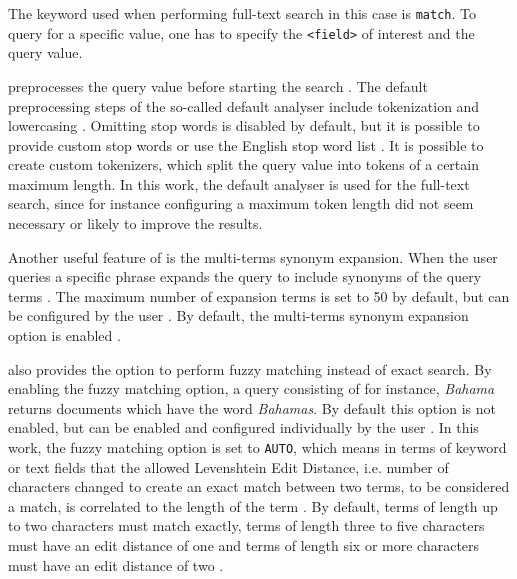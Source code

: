 

The keyword used when performing full-text search in this case is \texttt{match}.
To query for a specific value, one has to specify the \texttt{<field>} of interest and the query value.

\databaseName{} preprocesses the query value before starting the search \cite{Elasticsearch-text-analyser}.
The default preprocessing steps of the so-called default analyser include tokenization and lowercasing \cite{Elasticsearch-standard-analyser}. 
Omitting stop words is disabled by default, but it is possible to provide custom stop words or use the English stop word list \cite{Elasticsearch-standard-analyser}.
It is possible to create custom tokenizers, which split the query value into tokens of a certain maximum length.
In this work, the default analyser is used for the full-text search, since for instance configuring a maximum token length did not seem necessary or likely to improve the results.

Another useful feature of \databaseName{} is the multi-terms synonym expansion.
When the user queries a specific phrase \databaseName{} expands the query to include synonyms of the query terms \cite{Elasticsearch-synonyms}.
The maximum number of expansion terms is set to 50 by default, but can be configured by the user \cite{Elasticsearch-match}.
By default, the multi-terms synonym expansion option is enabled \cite{Elasticsearch-match}.

\databaseName{} also provides the option to perform fuzzy matching instead of exact search.
By enabling the fuzzy matching option, a \databaseName{} query consisting of for instance, \textit{Bahama} returns documents which have the word \textit{Bahamas}.
By default this option is not enabled, but can be enabled and configured individually by the user \cite{Elasticsearch-match}.
In this work, the fuzzy matching option is set to \texttt{AUTO}, which means in terms of keyword or text fields that the allowed Levenshtein Edit Distance, 
i.e. number of characters changed to create an exact match between two terms, to be considered a match, is correlated to the length of the term \cite{Elasticsearch-fuzziness}.
By default, terms of length up to two characters must match exactly, terms of length three to five characters must have an edit distance of one and 
terms of length six or more characters must have an edit distance of two \cite{Elasticsearch-fuzziness}.


